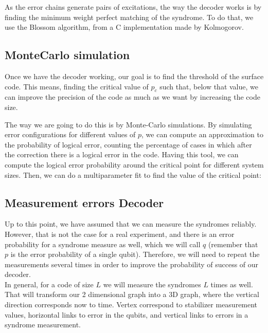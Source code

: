 \documentclass[a4paper,12pt]{article}
\begin{document}
As the error chains generate  pairs of excitations, the way the decoder works is by finding the minimum weight perfect matching of the syndrome. To do that, we use the Blossom algorithm, from a C implementation made by Kolmogorov.


\subsection{MonteCarlo simulation}

Once we have the decoder working, our goal is to find the threshold of the surface code. This means, finding the critical value of $p_c$ such that, below that value, we can improve the precision of the code as much as we want by increasing the code size.

The way we are going to do this is by Monte-Carlo simulations.  By simulating error configurations for different values of $p$, we can compute an approximation to the probability of logical error, counting the percentage of cases in which after the correction there is a logical error in the code. Having this tool, we can compute the logical error probability around the critical point for different system sizes. Then, we can do a multiparameter fit to find the value of the critical point:

\begin{figure}[ht!]
\begin{center}
\end{center}
\end{figure}


\subsection{Measurement errors Decoder}
Up to this point, we have assumed that we can measure the syndromes reliably. However, that is not the case for a real experiment, and there is an error probability for a syndrome measure as well, which we will call $q$ (remember that $p$ is the error probability of a single qubit). Therefore, we will need to repeat the measurements several times in order to improve the probability of success of our decoder.\\

In general, for a code of size $L$ we will measure the syndromes $L$ times as well. That will transform our 2 dimensional graph into a 3D graph, where the vertical direction corresponds now to time. Vertex correspond to stabilizer measurement values, horizontal links to error in the qubits, and vertical links to errors in a syndrome measurement.\\
\end{document}
